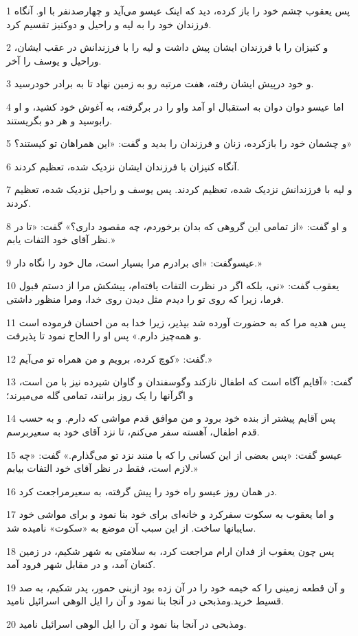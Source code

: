 \par 1 پس یعقوب چشم خود را باز کرده، دید که اینک عیسو می‌آید و چهارصدنفر با او. آنگاه فرزندان خود را به لیه و راحیل و دوکنیز تقسیم کرد.
\par 2 و کنیزان را با فرزندان ایشان پیش داشت و لیه را با فرزندانش در عقب ایشان، وراحیل و یوسف را آخر.
\par 3 و خود در‌پیش ایشان رفته، هفت مرتبه رو به زمین نهاد تا به برادر خودرسید.
\par 4 اما عیسو دوان دوان به استقبال او آمد واو را در بر‌گرفته، به آغوش خود کشید، و او رابوسید و هر دو بگریستند.
\par 5 و چشمان خود را بازکرده، زنان و فرزندان را بدید و گفت: «این همراهان تو کیستند؟»
\par 6 آنگاه کنیزان با فرزندان ایشان نزدیک شده، تعظیم کردند.
\par 7 و لیه با فرزندانش نزدیک شده، تعظیم کردند. پس یوسف و راحیل نزدیک شده، تعظیم کردند.
\par 8 و او گفت: «از تمامی این گروهی که بدان برخوردم، چه مقصود داری؟» گفت: «تا در نظر آقای خود التفات یابم.»
\par 9 عیسوگفت: «ای برادرم مرا بسیار است، مال خود را نگاه دار.»
\par 10 یعقوب گفت: «نی، بلکه اگر در نظرت التفات یافته‌ام، پیشکش مرا از دستم قبول فرما، زیرا که روی تو را دیدم مثل دیدن روی خدا، ومرا منظور داشتی.
\par 11 پس هدیه مرا که به حضورت آورده شد بپذیر، زیرا خدا به من احسان فرموده است و همه‌چیز دارم.» پس او را الحاح نمود تا پذیرفت.
\par 12 گفت: «کوچ کرده، برویم و من همراه تو می‌آیم.»
\par 13 گفت: «آقایم آگاه است که اطفال نازکند وگوسفندان و گاوان شیرده نیز با من است، و اگرآنها را یک روز برانند، تمامی گله می‌میرند؛
\par 14 پس آقایم پیشتر از بنده خود برود و من موافق قدم مواشی که دارم. و به حسب قدم اطفال، آهسته سفر می‌کنم، تا نزد آقای خود به سعیربرسم.
\par 15 عیسو گفت: «پس بعضی از این کسانی را که با منند نزد تو می‌گذارم.» گفت: «چه لازم است، فقط در نظر آقای خود التفات بیابم.»
\par 16 در همان روز عیسو راه خود را پیش گرفته، به سعیرمراجعت کرد.
\par 17 و اما یعقوب به سکوت سفرکرد و خانه‌ای برای خود بنا نمود و برای مواشی خود سایبانها ساخت. از این سبب آن موضع به «سکوت» نامیده شد.
\par 18 پس چون یعقوب از فدان ارام مراجعت کرد، به سلامتی به شهر شکیم، در زمین کنعان آمد، و در مقابل شهر فرود آمد.
\par 19 و آن قطعه زمینی را که خیمه خود را در آن زده بود ازبنی حمور، پدر شکیم، به صد قسیط خرید.ومذبحی در آنجا بنا نمود و آن را ایل الوهی اسرائیل نامید.
\par 20 ومذبحی در آنجا بنا نمود و آن را ایل الوهی اسرائیل نامید.
 
